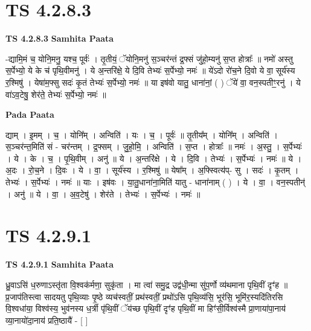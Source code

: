 \documentclass[17pt]{extarticle}
\begin{document}
\section{ TS 4.2.8.3 }

\textbf{TS 4.2.8.3 } \newline
\textbf{Samhita Paata} \newline

-द्यामि॒मं च॒ योनि॒मनु॒ यश्च॒ पूर्वः॑ । तृ॒तीयं॒ ॅयोनि॒मनु॑ स॒ञ्चर॑न्तं द्र॒फ्सं जु॑हो॒म्यनु॑ स॒प्त होत्राः᳚ ॥ नमो॑ अस्तु स॒र्पेभ्यो॒ ये के च॑ पृथि॒वीमनु॑ । ये अ॒न्तरि॑क्षे॒ ये दि॒वि तेभ्यः॑ स॒र्पेभ्यो॒ नमः॑ ॥ ये॑ऽदो रो॑च॒ने दि॒वो ये वा॒ सूर्य॑स्य र॒श्मिषु॑ । येषा॑म॒फ्सु सदः॑ कृ॒तं तेभ्यः॑ स॒र्पेभ्यो॒ नमः॑ ॥ या इष॑वो यातु॒ धाना॑नां॒ ( ) ॅये॑ वा॒ वन॒स्पतीꣳ॒॒रनु॑ । ये वा॑ऽव॒टेषु॒ शेर॑ते॒ तेभ्यः॑ स॒र्पेभ्यो॒ नमः॑ ॥ \newline

\textbf{Pada Paata} \newline

द्याम् । इ॒मम् । च॒ । योनि᳚म् । अन्विति॑ । यः । च॒ । पूर्वः॑ ॥ तृ॒तीय᳚म् । योनि᳚म् । अन्विति॑ । स॒ञ्चर॑न्त॒मिति॑ सं - चर॑न्तम् । द्र॒फ्सम् । जु॒हो॒मि॒ । अन्विति॑ । स॒प्त । होत्राः᳚ ॥ नमः॑ । अ॒स्तु॒ । स॒र्पेभ्यः॑ । ये । के । च॒ । पृ॒थि॒वीम् । अनु॑ ॥ ये । अ॒न्तरि॑क्षे । ये । दि॒वि । तेभ्यः॑ । स॒र्पेभ्यः॑ । नमः॑ ॥ ये । अ॒दः । रो॒च॒ने । दि॒वः । ये । वा॒ । सूर्य॑स्य । र॒श्मिषु॑ ॥ येषा᳚म् । अ॒फ्स्वित्य॑प्- सु । सदः॑ । कृ॒तम् । तेभ्यः॑ । स॒र्पेभ्यः॑ । नमः॑ ॥ याः । इष॑वः । या॒तु॒धाना॑ना॒मिति॑ यातु - धाना॑नाम् ( ) । ये । वा॒ । वन॒स्पतीन्॑ । अनु॑ ॥ ये । वा॒ । अ॒व॒टेषु॑ । शेर॑ते । तेभ्यः॑ । स॒र्पेभ्यः॑ । नमः॑ ॥  \newline





\section{ TS 4.2.9.1 }

\textbf{TS 4.2.9.1 } \newline
\textbf{Samhita Paata} \newline

ध्रु॒वाऽसि॑ ध॒रुणाऽस्तृ॑ता वि॒श्वक॑र्मणा॒ सुकृ॑ता । मा त्वा॑ समु॒द्र उद्व॑धी॒न्मा सु॑प॒र्णो व्य॑थमाना पृथि॒वीं दृꣳ॑ह ॥ प्र॒जाप॑तिस्त्वा सादयतु पृथि॒व्याः पृ॒ष्ठे व्यच॑स्वतीं॒ प्रथ॑स्वतीं॒ प्रथो॑ऽसि पृथि॒व्य॑सि॒ भूर॑सि॒ भूमि॑र॒स्यदि॑तिरसि वि॒श्वधा॑या॒ विश्व॑स्य॒ भुव॑नस्य ध॒र्त्री पृ॑थि॒वीं ॅय॑च्छ पृथि॒वीं दृꣳ॑ह पृथि॒वीं मा हिꣳ॑सी॒र्विश्व॑स्मै प्रा॒णाया॑पा॒नाय॑ व्या॒नायो॑दा॒नाय॑ प्रति॒ष्ठायै॑ - [  ] \newline
\end{document}
